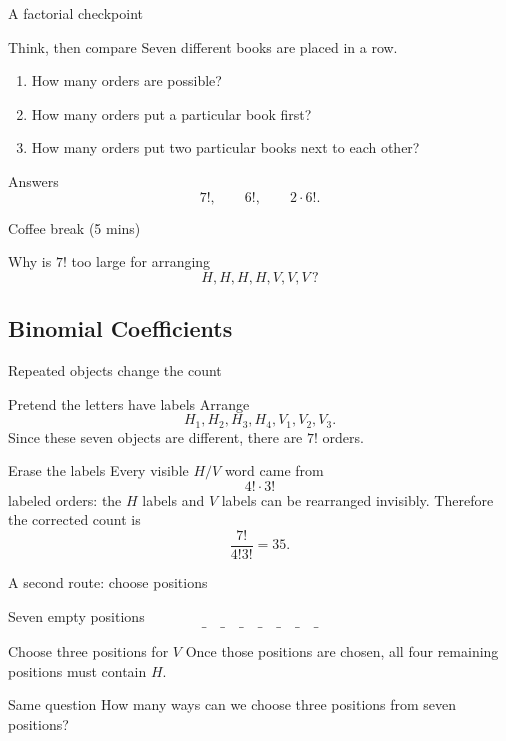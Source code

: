 \documentclass{beamer}
\begin{document}
\begin{frame}{A factorial checkpoint}
  \begin{block}{Think, then compare}
    Seven different books are placed in a row.
    \begin{enumerate}
      \item How many orders are possible?
      \item How many orders put a particular book first?
      \item How many orders put two particular books next to each other?
    \end{enumerate}
  \end{block}
\pause
  \begin{block}{Answers}
    \[
       7!,\qquad 6!,\qquad 2\cdot6!.
    \]
  \end{block}
\end{frame}

\begin{frame}{Coffee break (5 mins)}
  \begin{center}
    \Large
    Why is $7!$ too large for arranging\\[.75em]
    \[
       H,H,H,H,V,V,V\,?
    \]
  \end{center}
\end{frame}

\subsection{Binomial Coefficients}

\begin{frame}{Repeated objects change the count}
\footnotesize
  \begin{block}{Pretend the letters have labels}
    Arrange
    \[
      H_1,H_2,H_3,H_4,V_1,V_2,V_3.
    \]
    Since these seven objects are different, there are $7!$ orders.
  \end{block}
\pause
  \begin{block}{Erase the labels}
    Every visible $H/V$ word came from
    \[
       4!\cdot3!
    \]
    labeled orders: the $H$ labels and $V$ labels can be rearranged invisibly.
\pause
    Therefore the corrected count is
    \[
       \frac{7!}{4!3!}=35.
    \]
  \end{block}
\end{frame}

\begin{frame}{A second route: choose positions}
  \begin{block}{Seven empty positions}
    \[
       \_\quad\_\quad\_\quad\_\quad\_\quad\_\quad\_
    \]
  \end{block}
\pause
  \begin{block}{Choose three positions for $V$}
    Once those positions are chosen, all four remaining positions must contain $H$.
  \end{block}
\pause
  \begin{block}{Same question}
    How many ways can we choose three positions from seven positions?
  \end{block}
\end{frame}
\end{document}

